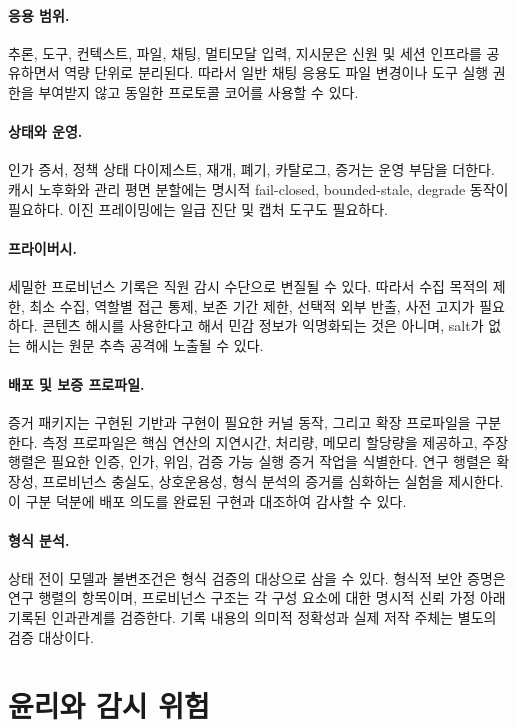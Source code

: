\documentclass[10pt]{article}
\begin{document}
\paragraph{응용 범위.}
추론, 도구, 컨텍스트, 파일, 채팅, 멀티모달 입력, 지시문은 신원 및 세션 인프라를 공유하면서 역량 단위로 분리된다. 따라서 일반 채팅 응용도 파일 변경이나 도구 실행 권한을 부여받지 않고 동일한 프로토콜 코어를 사용할 수 있다.

\paragraph{상태와 운영.}
인가 증서, 정책 상태 다이제스트, 재개, 폐기, 카탈로그, 증거는 운영 부담을 더한다. 캐시 노후화와 관리 평면 분할에는 명시적 fail-closed, bounded-stale, degrade 동작이 필요하다. 이진 프레이밍에는 일급 진단 및 캡처 도구도 필요하다.

\paragraph{프라이버시.}
세밀한 프로비넌스 기록은 직원 감시 수단으로 변질될 수 있다. 따라서 수집 목적의 제한, 최소 수집, 역할별 접근 통제, 보존 기간 제한, 선택적 외부 반출, 사전 고지가 필요하다. 콘텐츠 해시를 사용한다고 해서 민감 정보가 익명화되는 것은 아니며, salt가 없는 해시는 원문 추측 공격에 노출될 수 있다.

\paragraph{배포 및 보증 프로파일.}
증거 패키지는 구현된 기반과 구현이 필요한 커널 동작, 그리고 확장 프로파일을 구분한다. 측정 프로파일은 핵심 연산의 지연시간, 처리량, 메모리 할당량을 제공하고, 주장 행렬은 필요한 인증, 인가, 위임, 검증 가능 실행 증거 작업을 식별한다. 연구 행렬은 확장성, 프로비넌스 충실도, 상호운용성, 형식 분석의 증거를 심화하는 실험을 제시한다. 이 구분 덕분에 배포 의도를 완료된 구현과 대조하여 감사할 수 있다.

\paragraph{형식 분석.}
상태 전이 모델과 불변조건은 형식 검증의 대상으로 삼을 수 있다. 형식적 보안 증명은 연구 행렬의 항목이며, 프로비넌스 구조는 각 구성 요소에 대한 명시적 신뢰 가정 아래 기록된 인과관계를 검증한다. 기록 내용의 의미적 정확성과 실제 저작 주체는 별도의 검증 대상이다.

\section{윤리와 감시 위험}
\end{document}
